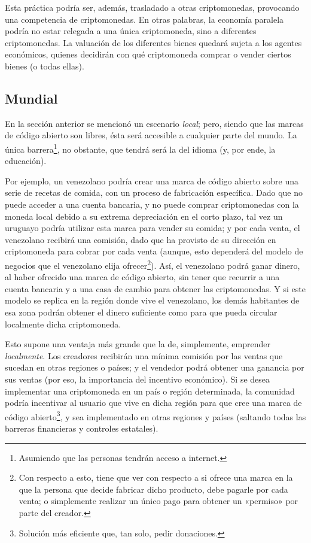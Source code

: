 \documentclass[12pt,a4paper]{article}
\begin{document}
Esta práctica podría ser, además, trasladado a otras criptomonedas, provocando una competencia de criptomonedas. En otras palabras, la economía paralela podría no estar relegada a una única criptomoneda, sino a diferentes criptomonedas. La valuación de los diferentes bienes quedará sujeta a los agentes económicos, quienes decidirán con qué criptomoneda comprar o vender ciertos bienes (o todas ellas).

\subsection{Mundial}
En la sección anterior se mencionó un escenario \textit{local}; pero, siendo que las marcas de código abierto son libres, ésta será accesible a cualquier parte del mundo. La única barrera\footnote{Asumiendo que las personas tendrán acceso a internet.}, no obstante, que tendrá será la del idioma (y, por ende, la educación).

Por ejemplo, un venezolano podría crear una marca de código abierto sobre una serie de recetas de comida, con un proceso de fabricación específica. Dado que no puede acceder a una cuenta bancaria, y no puede comprar criptomonedas con la moneda local debido a su extrema depreciación en el corto plazo, tal vez un uruguayo podría utilizar esta marca para vender su comida; y por cada venta, el venezolano recibirá una comisión, dado que ha provisto de su dirección en criptomoneda para cobrar por cada venta (aunque, esto dependerá del modelo de negocios que el venezolano elija ofrecer\footnote{Con respecto a esto, tiene que ver con respecto a si ofrece una marca en la que la persona que decide fabricar dicho producto, debe pagarle por cada venta; o simplemente realizar un único pago para obtener un «permiso» por parte del creador.}). Así, el venezolano podrá ganar dinero, al haber ofrecido una marca de código abierto, sin tener que recurrir a una cuenta bancaria y a una casa de cambio para obtener las criptomonedas. Y si este modelo se replica en la región donde vive el venezolano, los demás habitantes de esa zona podrán obtener el dinero suficiente como para que pueda circular localmente dicha criptomoneda.

Esto supone una ventaja más grande que la de, simplemente, emprender \textit{localmente}. Los creadores recibirán una mínima comisión por las ventas que sucedan en otras regiones o países; y el vendedor podrá obtener una ganancia por sus ventas (por eso, la importancia del incentivo económico). Si se desea implementar una criptomoneda en un país o región determinada, la comunidad podría incentivar al usuario que vive en dicha región para que cree una marca de código abierto\footnote{Solución más eficiente que, tan solo, pedir donaciones.}, y sea implementado en otras regiones y países (saltando todas las barreras financieras y controles estatales).
\end{document}

